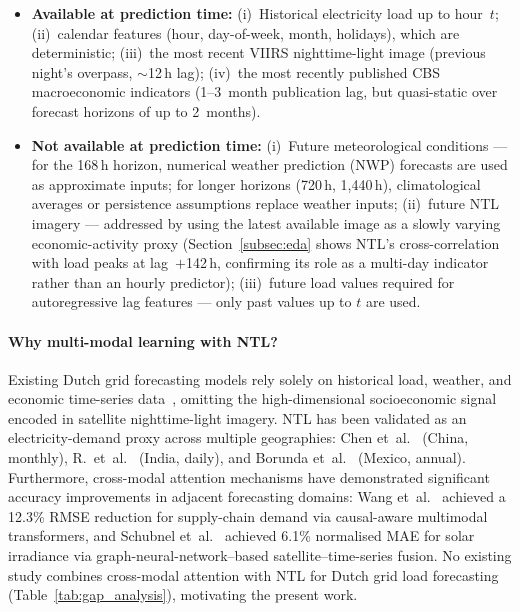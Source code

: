 \begin{itemize}
    \item \textbf{Available at prediction time:} (i)~Historical electricity load up to hour~$t$; (ii)~calendar features (hour, day-of-week, month, holidays), which are deterministic; (iii)~the most recent VIIRS nighttime-light image (previous night's overpass, $\sim$12\,h lag); (iv)~the most recently published CBS macroeconomic indicators (1--3~month publication lag, but quasi-static over forecast horizons of up to 2~months).
    \item \textbf{Not available at prediction time:} (i)~Future meteorological conditions — for the 168\,h horizon, numerical weather prediction (NWP) forecasts are used as approximate inputs; for longer horizons (720\,h, 1{,}440\,h), climatological averages or persistence assumptions replace weather inputs; (ii)~future NTL imagery — addressed by using the latest available image as a slowly varying economic-activity proxy (Section~\ref{subsec:eda} shows NTL's cross-correlation with load peaks at lag~$+$142\,h, confirming its role as a multi-day indicator rather than an hourly predictor); (iii)~future load values required for autoregressive lag features — only past values up to $t$ are used.
\end{itemize}

\paragraph{Why multi-modal learning with NTL?}
Existing Dutch grid forecasting models rely solely on historical load, weather, and economic time-series data~\cite{curiel_integrating_2025, van_de_sande_enhancing_2024, ashtar_hybrid_2025}, omitting the high-dimensional socioeconomic signal encoded in satellite nighttime-light imagery. NTL has been validated as an electricity-demand proxy across multiple geographies: Chen et~al.~\cite{chen_monthly_2025} (China, monthly), R.~et~al.~\cite{r_forecasting_2025} (India, daily), and Borunda et~al.~\cite{borunda_machine_2025} (Mexico, annual). Furthermore, cross-modal attention mechanisms have demonstrated significant accuracy improvements in adjacent forecasting domains: Wang et~al.~\cite{wang_causal-aware_2025} achieved a 12.3\% RMSE reduction for supply-chain demand via causal-aware multimodal transformers, and Schubnel et~al.~\cite{schubnel_solarcrossformer_2025} achieved 6.1\% normalised MAE for solar irradiance via graph-neural-network--based satellite--time-series fusion. No existing study combines cross-modal attention with NTL for Dutch grid load forecasting (Table~\ref{tab:gap_analysis}), motivating the present work.


